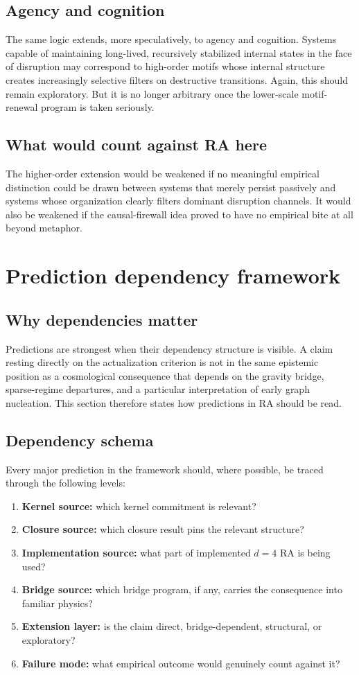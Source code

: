 \documentclass[11pt]{article}
\begin{document}
\subsection{Agency and cognition}
The same logic extends, more speculatively, to agency and cognition. Systems capable of maintaining long-lived, recursively stabilized internal states in the face of disruption may correspond to high-order motifs whose internal structure creates increasingly selective filters on destructive transitions. Again, this should remain exploratory. But it is no longer arbitrary once the lower-scale motif-renewal program is taken seriously.

\subsection{What would count against RA here}
The higher-order extension would be weakened if no meaningful empirical distinction could be drawn between systems that merely persist passively and systems whose organization clearly filters dominant disruption channels. It would also be weakened if the causal-firewall idea proved to have no empirical bite at all beyond metaphor.

\section{Prediction dependency framework}\label{sec:dependency-table}
\subsection{Why dependencies matter}
Predictions are strongest when their dependency structure is visible. A claim resting directly on the actualization criterion is not in the same epistemic position as a cosmological consequence that depends on the gravity bridge, sparse-regime departures, and a particular interpretation of early graph nucleation. This section therefore states how predictions in RA should be read.

\subsection{Dependency schema}
Every major prediction in the framework should, where possible, be traced through the following levels:
\begin{enumerate}[label=\arabic*.]
    \item \textbf{Kernel source:} which kernel commitment is relevant?
    \item \textbf{Closure source:} which closure result pins the relevant structure?
    \item \textbf{Implementation source:} what part of implemented $d=4$ RA is being used?
    \item \textbf{Bridge source:} which bridge program, if any, carries the consequence into familiar physics?
    \item \textbf{Extension layer:} is the claim direct, bridge-dependent, structural, or exploratory?
    \item \textbf{Failure mode:} what empirical outcome would genuinely count against it?
\end{enumerate}
\end{document}
